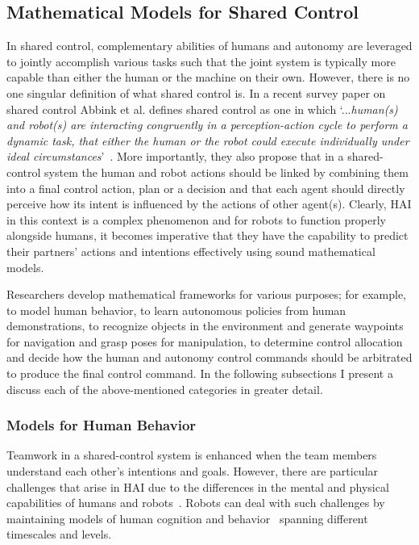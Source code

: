 \documentclass[12pt]{article}
\begin{document}
\subsection{Mathematical Models for Shared Control}
In shared control, complementary abilities of humans and autonomy are leveraged to jointly accomplish various tasks such that the joint system is typically more capable than either the human or the machine on their own. However, there is no one singular definition of what shared control is. In a recent survey paper on shared control Abbink et al. defines shared control as one in which `...\textit{human(s) and robot(s) are interacting congruently in a perception-action cycle to perform a dynamic task, that either the human or the robot could execute individually under ideal circumstances}'~\cite{abbink2018topology}. More importantly, they also propose that in a shared-control system the human and robot actions should be linked by combining them into a final control action, plan or a decision and that each agent should directly perceive how its intent is influenced by the actions of other agent(s). Clearly, HAI in this context is a complex phenomenon and for robots to function properly alongside humans, it becomes imperative that they have the capability to predict their partners' actions and intentions effectively using sound mathematical models. 

Researchers develop mathematical frameworks for various purposes; for example, to model human behavior, to learn autonomous policies from human demonstrations, to recognize objects in the environment and generate waypoints for navigation and grasp poses for manipulation, to determine control allocation and decide how the human and autonomy control commands should be arbitrated to produce the final control command. In the following subsections I present a discuss each of the above-mentioned categories in greater detail.  

\subsubsection{Models for Human Behavior}
Teamwork in a shared-control system is enhanced when the team members understand each other's intentions and goals. However, there are particular challenges that arise in HAI  due to the differences in the mental and physical capabilities of humans and robots~\cite{hiatt2017human}. Robots can deal with such challenges by maintaining models of human cognition and behavior~\cite{javdani2015shared} spanning different timescales and levels. 
\end{document}
